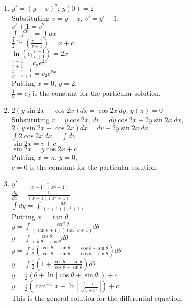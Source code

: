 \documentclass[a4paper]{article}
\begin{document}
\begin{enumerate}
{\begin{enumerate}
{\\Putting $x=1$, $y=1$,
\\$c=\frac{1}{\sqrt[]{2}}$ is the constant for the particular solution.
}
\item{$y'=(y-x)^2$; $y(0)=2$
\\Substituting $v=y-x$, $v'=y'-1$,
\\$v'+1=v^2$
\\$\int \frac{dv}{v^2-1}=\int dx$
\\$\frac{1}{2}\ln(\frac{v-1}{v+1})=x+c$
\\$\ln(c_1\frac{v-1}{v+1})=2x$
\\$\frac{v-1}{v+1}=c_2e^{2x}$
\\$\frac{y-x-1}{y-x+1}=c_2e^{2x}$
\\Putting $x=0$, $y=2$,
\\$\frac{1}{3}=c_2$ is the constant for the particular solution.
}
\item{$2(y\sin 2x+\cos 2x)dx=\cos 2x \ dy$; $y(\pi)=0$
\\Substituting $v=y\cos 2x$, $dv=dy\cos 2x - 2y\sin 2x \ dx$,
\\$2(y\sin 2x+\cos 2x)dx=dv+2y\sin 2x \ dx$
\\$\int 2\cos 2x \ dx=\int dv$
\\$\sin 2x = v+c$
\\$\sin 2x = y\cos 2x + c$
\\Putting $x=\pi$, $y=0$,
\\$c=0$ is the constant for the particular solution.
}
\item{$y'=\frac{1}{(x+1)(x^2+1)}$
\\$\frac{dy}{dx}=\frac{1}{(x+1)(x^2+1)}$
\\$\int dy=\int\frac{dx}{(x+1)(x^2+1)}$
\\Putting $x=\tan \theta$,
\\$y=\int \frac{\sec ^2 \theta}{(\tan \theta +1)(\tan ^2 \theta +1)} d\theta$
\\$y=\int \frac{\cos \theta}{\sin \theta + \cos \theta} d\theta$
\\$y=\int \frac{1}{2} (\frac{\cos \theta + \sin \theta}{\cos \theta + \sin \theta} + \frac{\cos \theta - \sin \theta}{\cos \theta + \sin \theta})d\theta$
\\$y=\int \frac{1}{2} (1 + \frac{\cos \theta - \sin \theta}{\cos \theta + \sin \theta})d\theta$
\\$y=\frac{1}{2}(\theta + \ln|\cos \theta + \sin \theta|) +c$
\\$y=\frac{1}{2}(\tan^{-1}x + \ln|\frac{1+x}{\sqrt[]{1+x^2}}|)+c$
\\This is the general solution for the differential equation.
}
\end{enumerate}

}
\end{enumerate}
\end{document}
